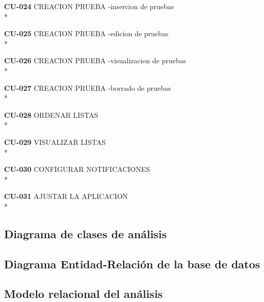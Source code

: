 \documentclass[../pfc.tex]{subfiles}
\begin{document}
	
	
	\textbf{CU-024}	CREACION PRUEBA -insercion de pruebas\\*
	
	\textbf{CU-025}	CREACION PRUEBA -edicion de pruebas\\*
	
	\textbf{CU-026}	CREACION PRUEBA -visualizacion de pruebas\\*
	
	\textbf{CU-027}	CREACION PRUEBA -borrado de pruebas\\*
	
	
	
	\textbf{CU-028}	ORDENAR LISTAS\\*
	
	
	
	\textbf{CU-029}	VISUALIZAR LISTAS\\*
	
	
	
	\textbf{CU-030}	CONFIGURAR NOTIFICACIONES\\*
	
	
	
	\textbf{CU-031}	AJUSTAR LA APLICACION\\*
	
	
		
	\subsection{Diagrama de clases de análisis}
		
	\subsection{Diagrama Entidad-Relación de la base de datos}
		
	\subsection{Modelo relacional del análisis}
	
\end{document}
